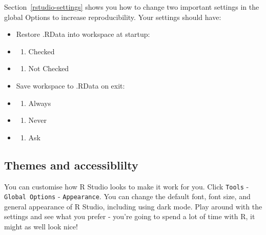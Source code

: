 \documentclass[
  oneside]{book}
\providecommand{\tightlist}{%
  \setlength{\itemsep}{0pt}\setlength{\parskip}{0pt}}
\begin{document}
\begin{try}

Section~\ref{rstudio-settings} shows you how to change two important settings in the global Options to increase reproducibility. Your settings should have:

\begin{itemize}
\item
  Restore .RData into workspace at startup:
\item
  \begin{enumerate}
  \def\labelenumi{(\Alph{enumi})}
  \tightlist
  \item
    Checked\\
  \end{enumerate}
\item
  \begin{enumerate}
  \def\labelenumi{(\Alph{enumi})}
  \setcounter{enumi}{1}
  \tightlist
  \item
    Not Checked
  \end{enumerate}
\item
  Save workspace to .RData on exit:
\item
  \begin{enumerate}
  \def\labelenumi{(\Alph{enumi})}
  \tightlist
  \item
    Always\\
  \end{enumerate}
\item
  \begin{enumerate}
  \def\labelenumi{(\Alph{enumi})}
  \setcounter{enumi}{1}
  \tightlist
  \item
    Never\\
  \end{enumerate}
\item
  \begin{enumerate}
  \def\labelenumi{(\Alph{enumi})}
  \setcounter{enumi}{2}
  \tightlist
  \item
    Ask
  \end{enumerate}
\end{itemize}

\end{try}

\subsection{Themes and accessiblilty}\label{themes-and-accessiblilty}

You can customise how R Studio looks to make it work for you. Click \texttt{Tools} - \texttt{Global\ Options} - \texttt{Appearance}. You can change the default font, font size, and general appearance of R Studio, including using dark mode. Play around with the settings and see what you prefer - you're going to spend a lot of time with R, it might as well look nice!
\end{document}
